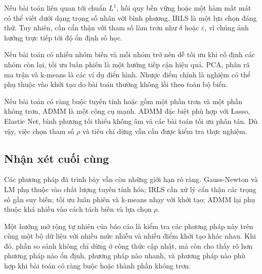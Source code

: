 Nếu bài toán liên quan tới chuẩn $L^1$, hồi quy bền vững hoặc một hàm mất mát có thể viết dưới dạng trọng số nhân với bình phương, IRLS là một lựa chọn đáng thử. Tuy nhiên, cần cẩn thận với tham số làm trơn như $\delta$ hoặc $\varepsilon$, vì chúng ảnh hưởng trực tiếp tới độ ổn định số học.
\medskip

Nếu bài toán có nhiều nhóm biến và mỗi nhóm trở nên dễ tối ưu khi cố định các nhóm còn lại, tối ưu luân phiên là một hướng tiếp cận hiệu quả. PCA, phân rã ma trận và k-means là các ví dụ điển hình. Nhược điểm chính là nghiệm có thể phụ thuộc vào khởi tạo do bài toán thường không lồi theo toàn bộ biến.
\medskip

Nếu bài toán có ràng buộc tuyến tính hoặc gồm một phần trơn và một phần không trơn, ADMM là một công cụ mạnh. ADMM đặc biệt phù hợp với Lasso, Elastic Net, bình phương tối thiểu không âm và các bài toán tối ưu phân tán. Dù vậy, việc chọn tham số $\rho$ và tiêu chí dừng vẫn cần được kiểm tra thực nghiệm.

\subsection{Nhận xét cuối cùng}
\label{SUB_SEC_nhan_xet_cuoi}
Các phương pháp đã trình bày vẫn còn những giới hạn rõ ràng. Gauss-Newton và LM phụ thuộc vào chất lượng tuyến tính hóa; IRLS cần xử lý cẩn thận các trọng số gần suy biến; tối ưu luân phiên và k-means nhạy với khởi tạo; ADMM lại phụ thuộc khá nhiều vào cách tách biến và lựa chọn $\rho$.
\medskip

Một hướng mở rộng tự nhiên của báo cáo là kiểm tra các phương pháp này trên cùng một bộ dữ liệu với nhiều mức nhiễu và nhiều điểm khởi tạo khác nhau. Khi đó, phần so sánh không chỉ dừng ở công thức cập nhật, mà còn cho thấy rõ hơn phương pháp nào ổn định, phương pháp nào nhanh, và phương pháp nào phù hợp khi bài toán có ràng buộc hoặc thành phần không trơn.
